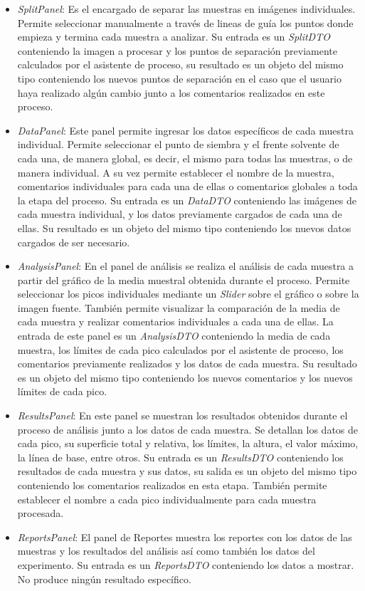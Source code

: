 \begin{itemize}
	\item \textit{SplitPanel}: Es el encargado de separar las muestras en im\'agenes individuales. Permite seleccionar manualmente a trav\'es de lineas de gu\'ia los puntos donde empieza y termina cada muestra a analizar. Su entrada es un \textit{SplitDTO} conteniendo la imagen a procesar y los puntos de separaci\'on previamente calculados por el asistente de proceso, su resultado es un objeto del mismo tipo conteniendo los nuevos puntos de separaci\'on en el caso que el usuario haya realizado alg\'un cambio junto a los comentarios realizados en este proceso.
	\item \textit{DataPanel}: Este panel permite ingresar los datos espec\'ificos de cada muestra individual. Permite seleccionar el punto de siembra y el frente solvente de cada una, de manera global, es decir, el mismo para todas las muestras, o de manera individual. A su vez permite establecer el nombre de la muestra, comentarios individuales para cada una de ellas o comentarios globales a toda la etapa del proceso. Su entrada es un \textit{DataDTO} conteniendo las im\'agenes de cada muestra individual, y los datos previamente cargados de cada una de ellas. Su resultado es un objeto del mismo tipo conteniendo los nuevos datos cargados de ser necesario.
	\item \textit{AnalysisPanel}: En el panel de an\'alisis se realiza el an\'alisis de cada muestra a partir del gr\'afico de la media muestral obtenida durante el proceso. Permite seleccionar los picos individuales mediante un \textit{Slider} sobre el gr\'afico o sobre la imagen fuente. Tambi\'en permite visualizar la comparaci\'on de la media de cada muestra y realizar comentarios individuales a cada una de ellas. La entrada de este panel es un \textit{AnalysisDTO} conteniendo la media de cada muestra, los l\'imites de cada pico calculados por el asistente de proceso, los comentarios previamente realizados y los datos de cada muestra. Su resultado es un objeto del mismo tipo conteniendo los nuevos comentarios y los nuevos l\'imites de cada pico.
	\item \textit{ResultsPanel}: En este panel se muestran los resultados obtenidos durante el proceso de an\'alisis junto a los datos de cada muestra. Se detallan los datos de cada pico, su superficie total y relativa, los l\'imites, la altura, el valor m\'aximo, la l\'inea de base, entre otros. Su entrada es un \textit{ResultsDTO} conteniendo los resultados de cada muestra y sus datos, su salida es un objeto del mismo tipo conteniendo los comentarios realizados en esta etapa. Tambi\'en permite establecer el nombre a cada pico individualmente para cada muestra procesada.
	\item \textit{ReportsPanel}: El panel de Reportes muestra los reportes con los datos de las muestras y los resultados del an\'alisis as\'i como tambi\'en los datos del experimento. Su entrada es un \textit{ReportsDTO} conteniendo los datos a mostrar. No produce ning\'un resultado espec\'ifico.
\end{itemize}

